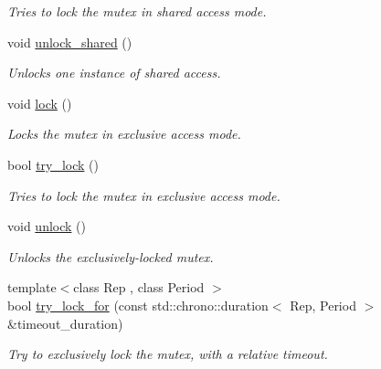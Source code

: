 \begin{DoxyCompactItemize}
\begin{DoxyCompactList}\small\item\em Tries to lock the mutex in shared access mode. \end{DoxyCompactList}\item 
void \hyperlink{classcpen333_1_1thread_1_1impl_1_1shared__mutex__exclusive_ab80e738628379fd1884aed75cf2b9081}{unlock\+\_\+shared} ()
\begin{DoxyCompactList}\small\item\em Unlocks one instance of shared access. \end{DoxyCompactList}\item 
void \hyperlink{classcpen333_1_1thread_1_1impl_1_1shared__mutex__exclusive_aba3fc22e9d8ecd0de29a267443f66aad}{lock} ()
\begin{DoxyCompactList}\small\item\em Locks the mutex in exclusive access mode. \end{DoxyCompactList}\item 
bool \hyperlink{classcpen333_1_1thread_1_1impl_1_1shared__mutex__exclusive_ae01b118cd23231f529f8666a3283380c}{try\+\_\+lock} ()
\begin{DoxyCompactList}\small\item\em Tries to lock the mutex in exclusive access mode. \end{DoxyCompactList}\item 
\mbox{\label{classcpen333_1_1thread_1_1impl_1_1shared__mutex__exclusive_aab3af6089fa19f79e98400f7681580c5}} 
void \hyperlink{classcpen333_1_1thread_1_1impl_1_1shared__mutex__exclusive_aab3af6089fa19f79e98400f7681580c5}{unlock} ()
\begin{DoxyCompactList}\small\item\em Unlocks the exclusively-\/locked mutex. \end{DoxyCompactList}\item 
{\footnotesize template$<$class Rep , class Period $>$ }\\bool \hyperlink{classcpen333_1_1thread_1_1impl_1_1shared__mutex__exclusive_a1416304bf7a677384b1bd27a678bff9b}{try\+\_\+lock\+\_\+for} (const std\+::chrono\+::duration$<$ Rep, Period $>$ \&timeout\+\_\+duration)
\begin{DoxyCompactList}\small\item\em Try to exclusively lock the mutex, with a relative timeout. \end{DoxyCompactList}\item 

\end{DoxyCompactItemize}
